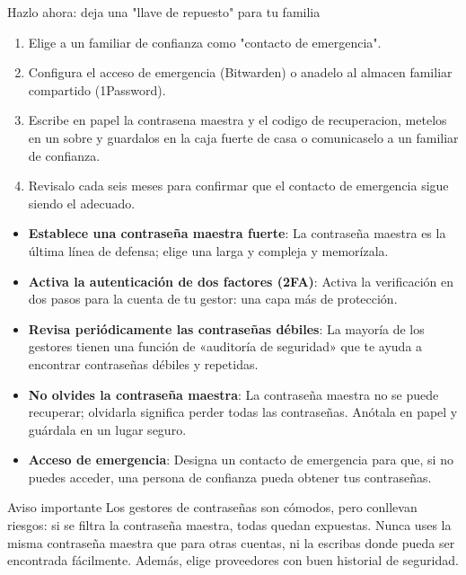 \begin{tcbpractice}{Hazlo ahora: deja una "llave de repuesto" para tu familia}
\begin{enumerate}
  \item Elige a un familiar de confianza como "contacto de emergencia".
  \item Configura el acceso de emergencia (Bitwarden) o anadelo al almacen familiar compartido (1Password).
  \item Escribe en papel la contrasena maestra y el codigo de recuperacion, metelos en un sobre y guardalos en la caja fuerte de casa o comunicaselo a un familiar de confianza.
  \item Revisalo cada seis meses para confirmar que el contacto de emergencia sigue siendo el adecuado.
\end{enumerate}

\end{tcbpractice}


\begin{itemize}
  \item \textbf{Establece una contraseña maestra fuerte}: La contraseña maestra es la última línea de defensa; elige una larga y compleja y memorízala.
  \item \textbf{Activa la autenticación de dos factores (2FA)}: Activa la verificación en dos pasos para la cuenta de tu gestor: una capa más de protección.
  \item \textbf{Revisa periódicamente las contraseñas débiles}: La mayoría de los gestores tienen una función de «auditoría de seguridad» que te ayuda a encontrar contraseñas débiles y repetidas.
  \item \textbf{No olvides la contraseña maestra}: La contraseña maestra no se puede recuperar; olvidarla significa perder todas las contraseñas. Anótala en papel y guárdala en un lugar seguro.
  \item \textbf{Acceso de emergencia}: Designa un contacto de emergencia para que, si no puedes acceder, una persona de confianza pueda obtener tus contraseñas.
\end{itemize}

\begin{tcbwarn}{Aviso importante}
Los gestores de contraseñas son cómodos, pero conllevan riesgos: si se filtra la contraseña maestra, todas quedan expuestas. Nunca uses la misma contraseña maestra que para otras cuentas, ni la escribas donde pueda ser encontrada fácilmente. Además, elige proveedores con buen historial de seguridad.

\end{tcbwarn}

